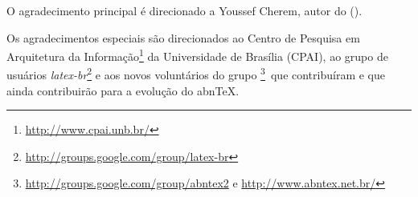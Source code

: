 \documentclass[
12pt,				%
openright,			%
twoside,			%
a4paper,			%
english,			%
french,				%
spanish,			%
brazil,				%
]{abntex2}
\begin{document}
	
	
	\frenchspacing 
	
	
	\imprimircapa
	
	\imprimirfolhaderosto*

	\begin{fichacatalografica}
		\sffamily
		\vspace*{\fill}					%
		\begin{center}					%
			\end{center}
	\end{fichacatalografica}

	\begin{agradecimentos}
		O agradecimento principal é direcionado a Youssef Cherem, autor do
		 ().
		
		Os agradecimentos especiais são direcionados ao Centro de Pesquisa em
		Arquitetura da Informação\footnote{\url{http://www.cpai.unb.br/}} da Universidade de
		Brasília (CPAI), ao grupo de usuários
		\emph{latex-br}\footnote{\url{http://groups.google.com/group/latex-br}} e aos
		novos voluntários do grupo
		\emph{\abnTeX}\footnote{\url{http://groups.google.com/group/abntex2} e
			\url{http://www.abntex.net.br/}}~que contribuíram e que ainda
		contribuirão para a evolução do abn\TeX.
		
	\end{agradecimentos}
	
\end{document}
